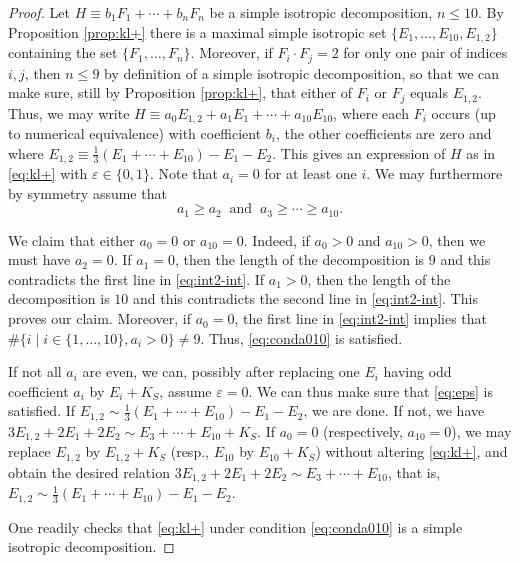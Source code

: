 \documentclass[11pt]{amsart}
\theoremstyle{definition}
\renewcommand{\leq}{\leqslant}
\renewcommand{\geq}{\geqslant}
\begin{document}
\begin{proof}
  Let $H \equiv b_1F_1+\cdots+b_nF_{n}$ be a simple isotropic decomposition, $n \leq 10$.  By Proposition \ref{prop:kl+}  there is  a maximal
simple isotropic set  $\{E_1,\ldots,E_{10},E_{1,2}\}$ containing the set $\{F_1,\ldots,F_{n}\}$.  Moreover, if $F_i \cdot F_j=2$ for only one pair of indices $i,j$, then $n \leq 9$ by definition of a simple isotropic decomposition,
so that we can make sure, still by Proposition \ref{prop:kl+}, that either of $F_i$ or $F_j$ equals $E_{1,2}$. 
 Thus, we may write
 $H \equiv a_0E_{1,2}+a_1E_1 + \cdots + a_{10}E_{10}$, where each $F_i$ occurs  (up to numerical equivalence) with coefficient $b_i$, the other coefficients are zero and
where $E_{1,2} \equiv
\frac{1}{3}\left(E_1+\cdots+E_{10}\right)-E_1-E_2$.
\color{black}
This gives an expression of $H$ as in \eqref{eq:kl+} with $\varepsilon \in \{0,1\}$.
Note that
\color{black}
$a_i=0$ for at least one $i$.
We may furthermore by symmetry assume that
\[
a_1 \geq a_2 \; \; \mbox{and} \; \; a_3 \geq \cdots \geq a_{10}.
\]

We claim that either $a_0=0$ or $a_{10}=0$. Indeed, if
$a_0 >0$ and $a_{10}>0$, then we must have $a_2=0$. If $a_1=0$, then the length of the decomposition is $9$ and this contradicts the first line in \eqref{eq:int2-int}. If $a_1>0$, then the length of the decomposition is $10$ and this contradicts the second line in \eqref{eq:int2-int}. This proves our claim.  Moreover, if $a_0=0$,  the first line in \eqref{eq:int2-int} implies that $\#\{i \; | \; i \in \{1,\ldots,10\}, a_i>0\} \neq 9$. \color{black} Thus,  \eqref{eq:conda010} is satisfied. \color{black}


  If 
not all $a_i$ are even, we can, possibly after replacing one $E_i$ having odd coefficient $a_i$ by $E_i+K_S$, assume $\varepsilon=0$. \color{black} We can thus make sure that \eqref{eq:eps} is satisfied. \color{black} If $E_{1,2} \sim \frac{1}{3}\left(E_1+\cdots+E_{10}\right)-E_1-E_2$, we are done. If not,  we have
$3E_{1,2}+2E_1+2E_2 \sim E_3+\cdots+E_{10} +K_S$. If $a_0=0$ (respectively, $a_{10}=0$), we may replace $E_{1,2}$ by $E_{1,2}+K_S$ (resp., $E_{10}$ by $E_{10}+K_S$) without altering \eqref{eq:kl+}, and obtain the desired relation $3E_{1,2}+2E_1+2E_2 \sim E_3+\cdots+E_{10}$, that is, $E_{1,2} \sim \frac{1}{3}\left(E_1+\cdots+E_{10}\right)-E_1-E_2$.

One readily checks that \eqref{eq:kl+} under condition \eqref{eq:conda010} is a simple isotropic decomposition. 
\end{proof}
\end{document}
